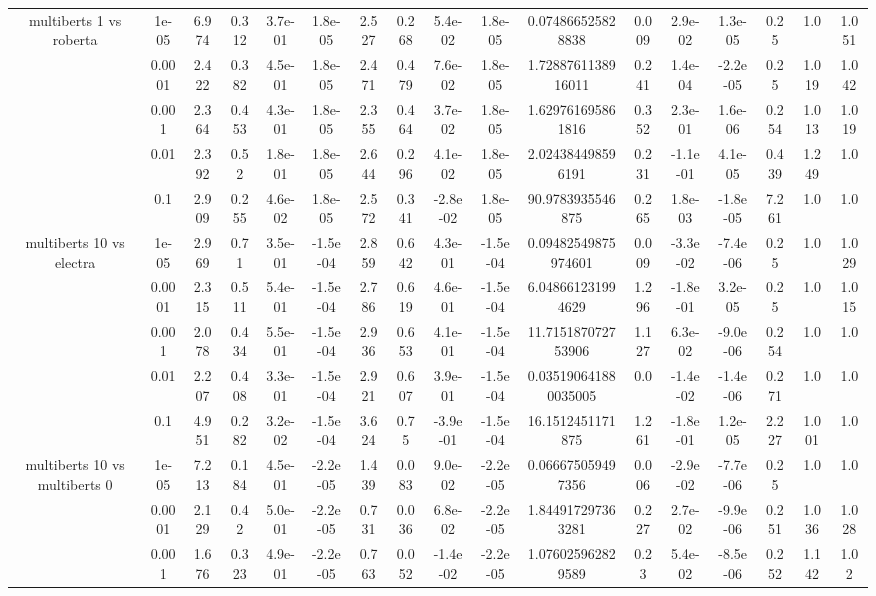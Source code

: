 \begin{tabular}{|c|c|c|c|c|c|c|c|c|c|c|c|c|c|c|c|c|}
\hline
\multirow{5}{*}{multiberts 1 vs roberta } & 1e-05 & 6.974 & 0.312 & 3.7e-01 & 1.8e-05 & 2.527 & 0.268 & 5.4e-02 & 1.8e-05 & 0.074866525828838 & 0.009 & 2.9e-02 & 1.3e-05 & 0.25 & 1.0 & 1.051 \\
 & 0.0001 & 2.422 & 0.382 & 4.5e-01 & 1.8e-05 & 2.471 & 0.479 & 7.6e-02 & 1.8e-05 & 1.7288761138916011 & 0.241 & 1.4e-04 & -2.2e-05 & 0.25 & 1.019 & 1.042 \\
 & 0.001 & 2.364 & 0.453 & 4.3e-01 & 1.8e-05 & 2.355 & 0.464 & 3.7e-02 & 1.8e-05 & 1.629761695861816 & 0.352 & 2.3e-01 & 1.6e-06 & 0.254 & 1.013 & 1.019 \\
 & 0.01 & 2.392 & 0.52 & 1.8e-01 & 1.8e-05 & 2.644 & 0.296 & 4.1e-02 & 1.8e-05 & 2.024384498596191 & 0.231 & -1.1e-01 & 4.1e-05 & 0.439 & 1.249 & 1.0 \\
 & 0.1 & 2.909 & 0.255 & 4.6e-02 & 1.8e-05 & 2.572 & 0.341 & -2.8e-02 & 1.8e-05 & 90.9783935546875 & 0.265 & 1.8e-03 & -1.8e-05 & 7.261 & 1.0 & 1.0 \\
\hline
\multirow{5}{*}{multiberts 10 vs electra } & 1e-05 & 2.969 & 0.71 & 3.5e-01 & -1.5e-04 & 2.859 & 0.642 & 4.3e-01 & -1.5e-04 & 0.09482549875974601 & 0.009 & -3.3e-02 & -7.4e-06 & 0.25 & 1.0 & 1.029 \\
 & 0.0001 & 2.315 & 0.511 & 5.4e-01 & -1.5e-04 & 2.786 & 0.619 & 4.6e-01 & -1.5e-04 & 6.048661231994629 & 1.296 & -1.8e-01 & 3.2e-05 & 0.25 & 1.0 & 1.015 \\
 & 0.001 & 2.078 & 0.434 & 5.5e-01 & -1.5e-04 & 2.936 & 0.653 & 4.1e-01 & -1.5e-04 & 11.715187072753906 & 1.127 & 6.3e-02 & -9.0e-06 & 0.254 & 1.0 & 1.0 \\
 & 0.01 & 2.207 & 0.408 & 3.3e-01 & -1.5e-04 & 2.921 & 0.607 & 3.9e-01 & -1.5e-04 & 0.035190641880035005 & 0.0 & -1.4e-02 & -1.4e-06 & 0.271 & 1.0 & 1.0 \\
 & 0.1 & 4.951 & 0.282 & 3.2e-02 & -1.5e-04 & 3.624 & 0.75 & -3.9e-01 & -1.5e-04 & 16.1512451171875 & 1.261 & -1.8e-01 & 1.2e-05 & 2.227 & 1.001 & 1.0 \\
\hline
\multirow{5}{*}{multiberts 10 vs multiberts 0} & 1e-05 & 7.213 & 0.184 & 4.5e-01 & -2.2e-05 & 1.439 & 0.083 & 9.0e-02 & -2.2e-05 & 0.066675059497356 & 0.006 & -2.9e-02 & -7.7e-06 & 0.25 & 1.0 & 1.0 \\
 & 0.0001 & 2.129 & 0.42 & 5.0e-01 & -2.2e-05 & 0.731 & 0.036 & 6.8e-02 & -2.2e-05 & 1.844917297363281 & 0.227 & 2.7e-02 & -9.9e-06 & 0.251 & 1.036 & 1.028 \\
 & 0.001 & 1.676 & 0.323 & 4.9e-01 & -2.2e-05 & 0.763 & 0.052 & -1.4e-02 & -2.2e-05 & 1.076025962829589 & 0.23 & 5.4e-02 & -8.5e-06 & 0.252 & 1.142 & 1.02 \\

\end{tabular}
